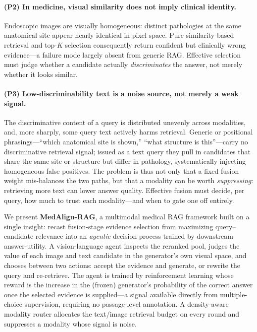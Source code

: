 \paragraph{(P2) In medicine, visual similarity does not imply clinical identity.}
Endoscopic images are visually homogeneous: distinct pathologies at the same
anatomical site appear nearly identical in pixel space. Pure similarity-based
retrieval and top-$K$ selection consequently return confident but clinically
wrong evidence---a failure mode largely absent from generic RAG. Effective
selection must judge whether a candidate actually \emph{discriminates} the
answer, not merely whether it looks similar.

\paragraph{(P3) Low-discriminability text is a noise source, not merely a weak signal.}
The discriminative content of a query is distributed unevenly across
modalities, and, more sharply, some query text actively harms retrieval.
Generic or positional phrasings---``which anatomical site is shown,'' ``what
structure is this''---carry no discriminative retrieval signal; issued as a text
query they pull in candidates that share the same site or structure but differ
in pathology, systematically injecting homogeneous false positives. The problem
is thus not only that a fixed fusion weight mis-balances the two paths, but that
a modality can be worth \emph{suppressing}: retrieving more text can lower answer
quality. Effective fusion must decide, per query, how much to trust each
modality---and when to gate one off entirely.

We present \textbf{MedAlign-RAG}, a multimodal medical RAG framework built on a
single insight: recast fusion-stage evidence selection from maximizing
query--candidate relevance into an \emph{agentic} decision process trained by
downstream answer-utility. A vision-language agent inspects the reranked pool,
judges the value of each image and text candidate in the generator's own visual
space, and chooses between two actions: accept the evidence and generate, or
rewrite the query and re-retrieve. The agent is trained by reinforcement
learning whose reward is the increase in the (frozen) generator's probability of
the correct answer once the selected evidence is supplied---a signal available
directly from multiple-choice supervision, requiring no passage-level
annotation. A density-aware modality router allocates the text/image retrieval
budget on every round and suppresses a modality whose signal is noise.

